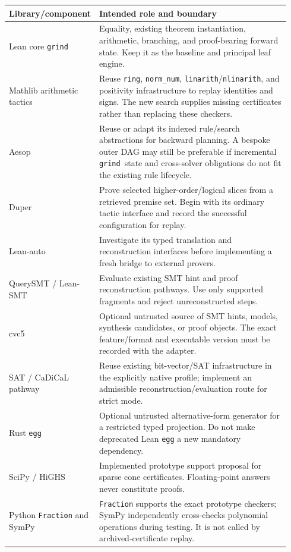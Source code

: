 \documentclass[11pt,a4paper]{article}
\newcommand{\grind}{\texttt{grind}}
\begin{document}
\begin{small}
\begin{longtable}{@{}p{0.24\linewidth}p{0.70\linewidth}@{}}
\toprule
Library/component & Intended role and boundary\\
\midrule
\endhead
Lean core \grind & Equality, existing theorem instantiation, arithmetic, branching, and proof-bearing forward state. Keep it as the baseline and principal leaf engine.\cite{grind-overview,grind-ring}\\[3pt]
Mathlib arithmetic tactics & Reuse \texttt{ring}, \texttt{norm\_num}, \texttt{linarith}/\texttt{nlinarith}, and positivity infrastructure to replay identities and signs. The new search supplies missing certificates rather than replacing these checkers.\cite{nlinarith,positivity}\\[3pt]
Aesop & Reuse or adapt its indexed rule/search abstractions for backward planning. A bespoke outer DAG may still be preferable if incremental \grind\ state and cross-solver obligations do not fit the existing rule lifecycle.\cite{aesop}\\[3pt]
Duper & Prove selected higher-order/logical slices from a retrieved premise set. Begin with its ordinary tactic interface and record the successful configuration for replay.\cite{duper}\\[3pt]
Lean-auto & Investigate its typed translation and reconstruction interfaces before implementing a fresh bridge to external provers.\cite{lean-auto}\\[3pt]
QuerySMT / Lean-SMT & Evaluate existing SMT hint and proof reconstruction pathways. Use only supported fragments and reject unreconstructed steps.\cite{querysmt,lean-smt}\\[3pt]
cvc5 & Optional untrusted source of SMT hints, models, synthesis candidates, or proof objects. The exact feature/format and executable version must be recorded with the adapter.\cite{cvc5-proofs,querysmt}\\[3pt]
SAT / CaDiCaL pathway & Reuse existing bit-vector/SAT infrastructure in the explicitly native profile; implement an admissible reconstruction/evaluation route for strict mode.\cite{grind-overview,tactic-reference}\\[3pt]
Rust \texttt{egg} & Optional untrusted alternative-form generator for a restricted typed projection. Do not make deprecated Lean \texttt{egg} a new mandatory dependency.\cite{egg-library,lean-egg}\\[3pt]
SciPy / HiGHS & Implemented prototype support proposal for sparse cone certificates. Floating-point answers never constitute proofs.\cite{scipy}\\[3pt]
Python \texttt{Fraction} and SymPy & \texttt{Fraction} supports the exact prototype checkers; SymPy independently cross-checks polynomial operations during testing. It is not called by archived-certificate replay.\cite{sympy}\\
\bottomrule
\end{longtable}
\end{small}
\end{document}
